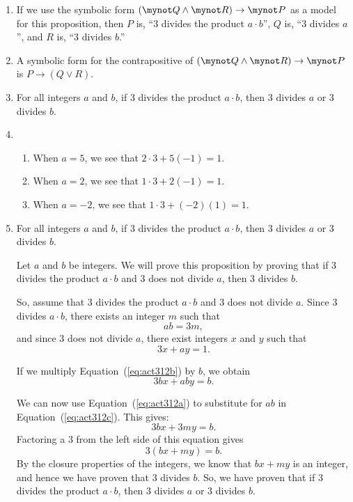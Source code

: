 \documentclass[11pt]{article}
\begin{document}
\begin{enumerate}
\item If we use the symbolic form  
$\left( {\mynot  Q \wedge \mynot  R} \right) \to \mynot  P$  as a model for this proposition, then  $P$  is, ``3 divides the product  $a \cdot b$'',  $Q$  is, ``3  divides  $a$'', and  $R$ is, 
``3 divides  $b$.''  

\item A  symbolic form for the contrapositive of   
$\left( {\mynot  Q \wedge \mynot  R} \right) \to \mynot  P$ is  $P \to \left( {Q \vee R} \right)$.

\item For all integers $a$  and  $b$, if  3  divides the product  $a \cdot b$, then  3  divides  $a$  or  3  divides  $b$.

\item \begin{enumerate}
  \item When  $a = 5$, we see that  $2 \cdot 3 + 5\left( { - 1} \right) = 1$.
  \item When  $a = 2$, we see that  $1 \cdot 3 + 2\left( { - 1} \right) = 1$.
  \item When $a =  - 2$, we see that  $1 \cdot 3 + \left( { - 2} \right)\left( 1 \right) = 1$.
\end{enumerate}

\item
For all integers $a$  and  $b$, if  3  divides the product  $a \cdot b$, then  3  divides  $a$  or  3  divides  $b$.

\begin{myproof}
Let  $a$  and  $b$  be integers.  We will prove this proposition by proving that if  3  divides the product  $a \cdot b$ and  3  does not divide  $a$, then  3  divides  $b$.

So, assume that   3  divides the product  $a \cdot b$  and  3  does not divide  $a$.  Since  3  divides  $a \cdot b$, there exists an integer  $m$  such that
\setcounter{equation}{0}
\begin{equation} \label{eq:act312a}
a b = 3m,
\end{equation}
%
and since  3  does not divide  $a$, there exist integers  $x$  and  $y$  such that
\begin{equation} \label{eq:act312b}
3x + ay = 1.
\end{equation}

If we multiply Equation~(\ref{eq:act312b}) by  $b$, we obtain
\begin{equation} \label{eq:act312c}
3bx + aby = b.
\end{equation}

We can now use Equation~(\ref{eq:act312a}) to substitute for  $a b$ in 
Equation~(\ref{eq:act312c}).  This gives:
\[
3bx + 3my = b.
\]
Factoring a  3  from the left side of this equation gives 
\[
3\left( {bx + my} \right) = b.
\]
By the closure properties of the integers, we know that  $bx + my$ is an integer, and hence we have proven that  3 divides  $b$.  So, we have proven that if  3  divides the product  
$a \cdot b$, then  3  divides  $a$  or  3  divides  $b$.
\end{myproof}
\end{enumerate}
\end{document}
